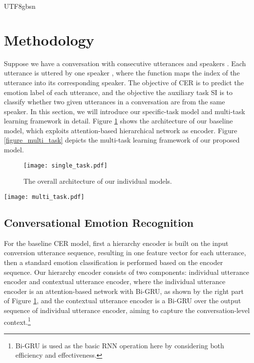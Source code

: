 \documentclass{article}
\begin{document}
\begin{CJK}{UTF8}{gbsn}
\section{Methodology}
Suppose we have a conversation with  consecutive utterances  and  speakers . Each utterance  is uttered by one speaker , where the function  maps the index of the utterance into its corresponding speaker. 
The objective of CER is to predict the emotion label of each utterance, and the objective the auxiliary task SI is to classify whether two given utterances  in a conversation are from the same speaker.
In this section, we will introduce our specific-task model and multi-task learning framework in detail. 
Figure \ref{figure_single_task} shows the architecture of our baseline model, which exploits attention-based hierarchical network as encoder.
Figure \ref{figure_multi_task} depicts the multi-task learning framework of our proposed model. 


\begin{figure}[t]
  \centering
  \texttt{[image: single\_task.pdf]}
  \caption{The overall architecture of our individual models.}
  \label{figure_single_task}
\end{figure}


\begin{figure*}[t]
  \centering
  \texttt{[image: multi\_task.pdf]}
  \caption{Illustration of our proposed model for CER and SI.}
  \label{figure_multi_task}
\end{figure*}

\subsection{Conversational Emotion Recognition}
For the baseline CER model, first a hierarchy encoder is built on the input conversion utterance sequence, resulting in one feature vector for each utterance,
then a standard emotion classification is performed based on the encoder sequence.
Our hierarchy encoder consists of two components: individual utterance encoder and contextual utterance encoder, 
where the individual utterance encoder is an attention-based network  with Bi-GRU, 
as shown by the right part of Figure \ref{figure_single_task},
and the contextual utterance encoder is a Bi-GRU over the output sequence of individual utterance encoder,
aiming to capture the conversation-level context.\footnote{Bi-GRU is used as the basic RNN operation here by considering both efficiency and effectiveness. }



\end{CJK}
\end{document}
